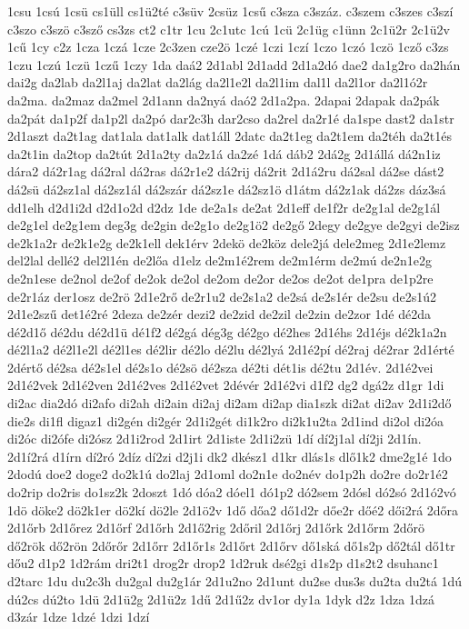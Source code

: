 {1csu
1csú
1csü
cs1üll
cs1ü2té
c3süv
2csüz
1csű
c3sza
c3száz.
c3szem
c3szes
c3szí
c3szo
c3szö
c3sző
cs3zs
ct2
c1tr
1cu
2c1utc
1cú
1cü
2c1üg
c1ünn
2c1ü2r
2c1ü2v
1cű
1cy
c2z
1cza
1czá
1cze
2c3zen
cze2ö
1czé
1czi
1czí
1czo
1czó
1czö
1cző
c3zs
1czu
1czú
1czü
1czű
1czy
1da
daá2
2d1abl
2d1add
2d1a2dó
dae2
da1g2ro
da2hán
dai2g
da2lab
da2l1aj
da2lat
da2lág
da2l1e2l
da2l1im
dal1l
da2l1or
da2l1ó2r
da2ma.
da2maz
da2mel
2d1ann
da2nyá
daó2
2d1a2pa.
2dapai
2dapak
da2pák
da2pát
da1p2f
da1p2l
da2pó
dar2c3h
dar2cso
da2rel
da2r1é
da1spe
dast2
da1str
2d1aszt
da2t1ag
dat1ala
dat1alk
dat1áll
2datc
da2t1eg
da2t1em
da2téh
da2t1és
da2t1in
da2top
da2tút
2d1a2ty
da2z1á
da2zé
1dá
dáb2
2dá2g
2d1állá
dá2n1iz
dára2
dá2r1ag
dá2ral
dá2ras
dá2r1e2
dá2rij
dá2rit
2d1á2ru
dá2sal
dá2se
dást2
dá2sü
dá2sz1al
dá2sz1ál
dá2szár
dá2sz1e
dá2sz1ö
d1átm
dá2z1ak
dá2zs
dáz3sá
dd1elh
d2d1i2d
d2d1o2d
d2dz
1de
de2a1s
de2at
2d1eff
de1f2r
de2g1al
de2g1ál
de2g1el
de2g1em
deg3g
de2gin
de2g1o
de2g1ö2
de2gő
2degy
de2gye
de2gyi
de2isz
de2k1a2r
de2k1e2g
de2k1ell
dek1érv
2dekö
de2köz
dele2já
dele2meg
2d1e2lemz
del2lal
dellé2
del2l1én
de2lőa
d1elz
de2m1é2rem
de2m1érm
de2mú
de2n1e2g
de2n1ese
de2nol
de2of
de2ok
de2ol
de2om
de2or
de2os
de2ot
de1pra
de1p2re
de2r1áz
der1osz
de2rö
2d1e2rő
de2r1u2
de2s1a2
de2sá
de2s1ér
de2su
de2s1ú2
2d1e2szű
det1é2ré
2deza
de2zér
dezi2
de2zid
de2zil
de2zin
de2zor
1dé
dé2da
dé2d1ő
dé2du
dé2d1ü
dé1f2
dé2gá
dég3g
dé2go
dé2hes
2d1éhs
2d1éjs
dé2k1a2n
dé2l1a2
dé2l1e2l
dé2l1es
dé2lir
dé2lo
dé2lu
dé2lyá
2d1é2pí
dé2raj
dé2rar
2d1érté
2dértő
dé2sa
dé2s1el
dé2s1o
dé2sö
dé2sza
dé2ti
dét1is
dé2tu
2d1év.
2d1é2vei
2d1é2vek
2d1é2ven
2d1é2ves
2d1é2vet
2dévér
2d1é2vi
d1f2
dg2
dgá2z
d1gr
1di
di2ac
dia2dó
di2afo
di2ah
di2ain
di2aj
di2am
di2ap
dia1szk
di2at
di2av
2d1i2dő
die2s
di1fl
digaz1
di2gén
di2gér
2d1i2gét
di1k2ro
di2k1u2ta
2d1ind
di2ol
di2óa
di2óc
di2ófe
di2ósz
2d1i2rod
2d1irt
2d1iste
2d1i2zü
1dí
dí2j1al
dí2ji
2d1ín.
2d1í2rá
d1írn
dí2ró
2díz
dí2zi
d2j1i
dk2
dkész1
d1kr
dlás1s
dlő1k2
dme2g1é
1do
2dodú
doe2
doge2
do2k1ú
do2laj
2d1oml
do2n1e
do2név
do1p2h
do2re
do2r1é2
do2rip
do2ris
do1sz2k
2doszt
1dó
dóa2
dóel1
dó1p2
dó2sem
2dósl
dó2só
2d1ó2vó
1dö
döke2
dö2k1er
dö2kí
dö2le
2d1ö2v
1dő
dőa2
dő1d2r
dőe2r
dőé2
dői2rá
2dőra
2d1őrb
2d1őrez
2d1őrf
2d1őrh
2d1ő2rig
2dőril
2d1őrj
2d1őrk
2d1őrm
2dőrö
dő2rök
dő2rön
2dőrőr
2d1őrr
2d1őr1s
2d1őrt
2d1őrv
dő1ská
dő1s2p
dő2tál
dő1tr
dőu2
d1p2
1d2rám
dri2t1
drog2r
drop2
1d2ruk
dsé2gi
d1s2p
d1s2t2
dsuhanc1
d2tarc
1du
du2c3h
du2gal
du2g1ár
2d1u2no
2d1unt
du2se
dus3s
du2ta
du2tá
1dú
dú2cs
dú2to
1dü
2d1ü2g
2d1ü2z
1dű
2d1ű2z
dv1or
dy1a
1dyk
d2z
1dza
1dzá
d3zár
1dze
1dzé
1dzi
1dzí
}
